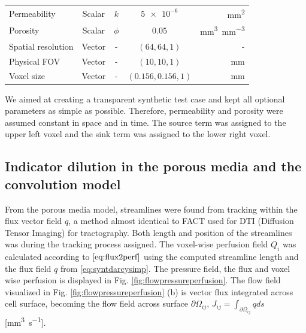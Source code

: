 \documentclass[paper=a4, fontsize=11pt,parskip=half,headings=small]{scrartcl}
\newcommand{\Perf}{Q}
\newcommand{\siFmm}{\milli\meter\cubed\per\second}
\begin{document}
\begin{table}[H]
\begin{tabular}{ l  c  c c  r }
			Permeability  							&	Scalar	& $k$ 				& $\num{5e-6}$ 			& \si{\square\milli\meter} 			\\
			Porosity \cite{wu03}						&	Scalar	& $\phi$ 			& $0.05$ 				& \si{\cubic\milli\meter\per\cubic\milli\meter}	\\	
			Spatial resolution 						&	Vector	& - 				& $(64,64,1)$ 			& -					\\
			Physical FOV 							&	Vector & - 				& $(10,10,1)$ 			& \si{\milli\meter}				\\
			Voxel size 							&	Vector	& - 				& $(0.156,0.156,1)$ 	& \si{\milli\meter}	\\
	  \end{tabular}
	  \label{tab:par}
	\end{table}	
	
	We aimed at creating a transparent synthetic test case and kept all optional parameters as simple as possible. 
	Therefore, permeability and porosity were assumed constant in space and in time. The source term was assigned to the upper left voxel and the sink term was assigned to the lower right voxel. 
	
	\subsection{Indicator dilution in the porous media and the convolution model}


From the porous media model, streamlines were found from tracking within the flux vector field $q$, a method almost identical to FACT used for DTI (Diffusion Tensor Imaging) for tractography. Both length and position of the streamlines was during the tracking process assigned. The voxel-wise perfusion field $\Perf_i$ was calculated according to $\eqref{eq:flux2perf}$ using the computed streamline length and the flux field $q$ from \eqref{eq:syntdarcysimp}. The pressure field, the flux and voxel wise perfusion is displayed in Fig. \ref{fig:flowpressureperfusion}. The flow field visualized in  Fig. \ref{fig:flowpressureperfusion} (b) is vector flux integrated across cell surface, becoming the flow field across surface $\partial \Omega_{ij}$, $J_{ij} = \int_{\partial \Omega_{ij}}q ds$ [\si{\siFmm}].
\end{document}

